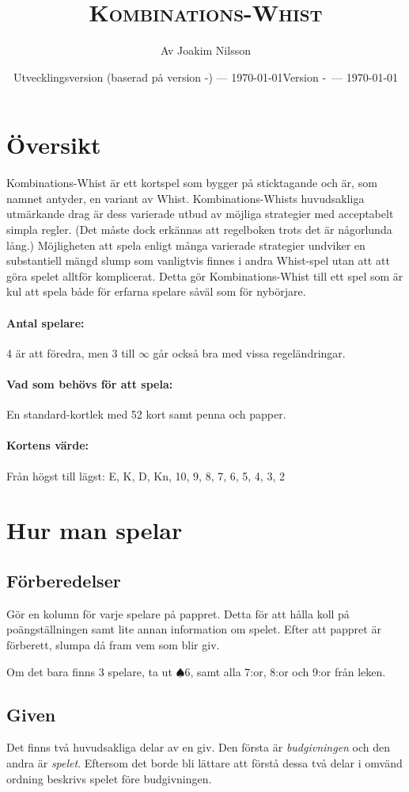 \documentclass[a4paper]{article}
\title{\textsc{Kombinations-Whist}}
\author{Av Joakim Nilsson}
\date{Utvecklingsversion (baserad på version \varVersion-\varLanguage) --- \today}
\date{Version \varVersion-\varLanguage\ --- \today}
\begin{document}
	\introPages

	\section{Översikt}
		Kombinations-Whist är ett kortspel som bygger på sticktagande och är, som namnet antyder, en variant av Whist. Kombinations-Whists huvudsakliga utmärkande drag är dess varierade utbud av möjliga strategier med acceptabelt simpla regler. (Det måste dock erkännas att regelboken trots det är någorlunda lång.) Möjligheten att spela enligt många varierade strategier undviker en substantiell mängd slump som vanligtvis finnes i andra Whist-spel utan att att göra spelet alltför komplicerat. Detta gör Kombinations-Whist till ett spel som är kul att spela både för erfarna spelare såväl som för nybörjare.

		\paragraph{Antal spelare:}
		4 är att föredra, men 3 till $\infty$ går också bra med vissa regeländringar.

		\paragraph{Vad som behövs för att spela:}
		En standard-kortlek med 52 kort samt penna och papper.

		\paragraph{Kortens värde:}
		Från högst till lägst: E, K, D, Kn, 10, 9, 8, 7, 6, 5, 4, 3, 2

	\section{Hur man spelar}
		\subsection{Förberedelser}
			Gör en kolumn för varje spelare på pappret. Detta för att hålla koll på poängställningen samt lite annan information om spelet. Efter att pappret är förberett, slumpa då fram vem som blir giv.

			Om det bara finns 3 spelare, ta ut $\spadesuit 6$, samt alla 7:or, 8:or och 9:or från leken.

		\subsection{Given}
			Det finns två huvudsakliga delar av en giv. Den första är \emph{budgivningen} och den andra är \emph{spelet}. Eftersom det borde bli lättare att förstå dessa två delar i omvänd ordning beskrivs spelet före budgivningen.
\end{document}
